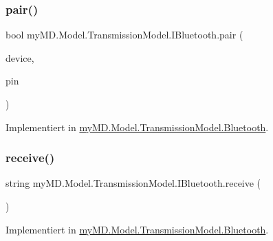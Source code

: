 \subsubsection{\texorpdfstring{pair()}{pair()}}
{\footnotesize\ttfamily bool my\+M\+D.\+Model.\+Transmission\+Model.\+I\+Bluetooth.\+pair (\begin{DoxyParamCaption}\item[{\mbox{\hyperlink{interfacemy_m_d_1_1_model_interface_1_1_transmission_model_interface_1_1_i_device}{I\+Device}}}]{device,  }\item[{string}]{pin }\end{DoxyParamCaption})}



Implementiert in \mbox{\hyperlink{classmy_m_d_1_1_model_1_1_transmission_model_1_1_bluetooth_a4955c9878fb425d4c20f344ecd16c2d1}{my\+M\+D.\+Model.\+Transmission\+Model.\+Bluetooth}}.

\mbox{\label{interfacemy_m_d_1_1_model_1_1_transmission_model_1_1_i_bluetooth_aa835ad437ee703e3ae74f43e09c28fbc}} 
\subsubsection{\texorpdfstring{receive()}{receive()}}
{\footnotesize\ttfamily string my\+M\+D.\+Model.\+Transmission\+Model.\+I\+Bluetooth.\+receive (\begin{DoxyParamCaption}{ }\end{DoxyParamCaption})}



Implementiert in \mbox{\hyperlink{classmy_m_d_1_1_model_1_1_transmission_model_1_1_bluetooth_aedbb2bbfe638eb5e83497c7b4e74d99d}{my\+M\+D.\+Model.\+Transmission\+Model.\+Bluetooth}}.

\mbox{\label{interfacemy_m_d_1_1_model_1_1_transmission_model_1_1_i_bluetooth_adfa691c5290cab1d92390f585cc9abdb}} 
